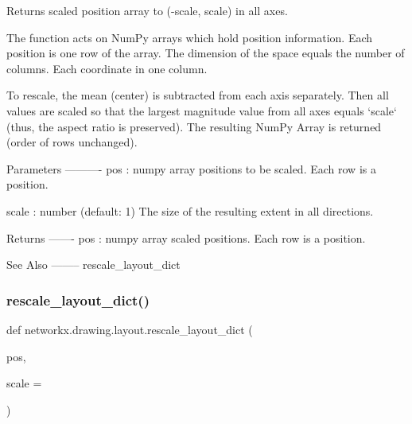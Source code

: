 \begin{DoxyVerb}Returns scaled position array to (-scale, scale) in all axes.

The function acts on NumPy arrays which hold position information.
Each position is one row of the array. The dimension of the space
equals the number of columns. Each coordinate in one column.

To rescale, the mean (center) is subtracted from each axis separately.
Then all values are scaled so that the largest magnitude value
from all axes equals `scale` (thus, the aspect ratio is preserved).
The resulting NumPy Array is returned (order of rows unchanged).

Parameters
----------
pos : numpy array
    positions to be scaled. Each row is a position.

scale : number (default: 1)
    The size of the resulting extent in all directions.

Returns
-------
pos : numpy array
    scaled positions. Each row is a position.

See Also
--------
rescale_layout_dict
\end{DoxyVerb}
 \mbox{\label{namespacenetworkx_1_1drawing_1_1layout_a9da50cbee09c4590ddb983e828ee5c91}} 
\subsubsection{\texorpdfstring{rescale\+\_\+layout\+\_\+dict()}{rescale\_layout\_dict()}}
{\footnotesize\ttfamily def networkx.\+drawing.\+layout.\+rescale\+\_\+layout\+\_\+dict (\begin{DoxyParamCaption}\item[{}]{pos,  }\item[{}]{scale = {} }\end{DoxyParamCaption})}


